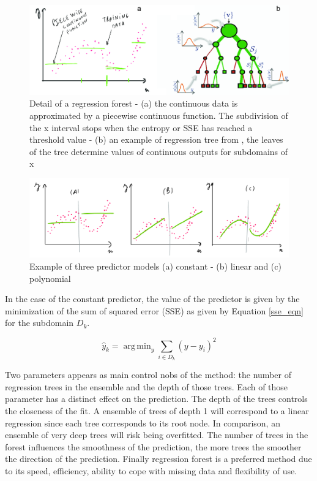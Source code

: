 \documentclass{article} %
\DeclareMathOperator*{\argmin}{arg\,min}
\begin{document}
\begin{figure}[h]
	\centering
	\includegraphics[width=1\textwidth]{rf}
	\caption{Detail of a regression forest - (a) the continuous data is approximated by a piecewise continuous function. The subdivision of the x interval stops when the entropy or SSE has reached a threshold value - (b) an example of regression tree from 	\cite{criminisi2011decision}, the leaves of the tree determine values of continuous outputs for subdomains of x}
	\label{fig:rf}
\end{figure}

\begin{figure}[h]
	\centering
	\includegraphics[width=1\textwidth]{rfpredictors}
	\caption{Example of three predictor models (a) constant - (b) linear and (c) polynomial}
	\label{fig:RFpredictors}
\end{figure}

In the case of the constant predictor, the value of the predictor is given by the minimization of the sum of squared error (SSE) as given by Equation \ref{sse_eqn} for the subdomain $D_k$. 

\begin{equation} \label{sse_eqn}
\hat{y}_k = \argmin_y \sum_{i \in D_k} (y-y_i)^2
\end{equation}

Two parameters appears as main control nobs of the method: the number of regression trees in the ensemble and the depth of those trees. Each of those parameter has a distinct effect on the prediction. The depth of the trees controls the closeness of the fit. A ensemble of trees of depth 1 will correspond to a linear regression since each tree corresponds to its root node. In comparison, an ensemble of very deep trees will risk being overfitted. The number of trees in the forest influences the smoothness of the prediction, the more trees the smoother the direction of the prediction. 
Finally regression forest is a preferred method due to its speed, efficiency, ability to cope with missing data and flexibility of use. 
\end{document}
